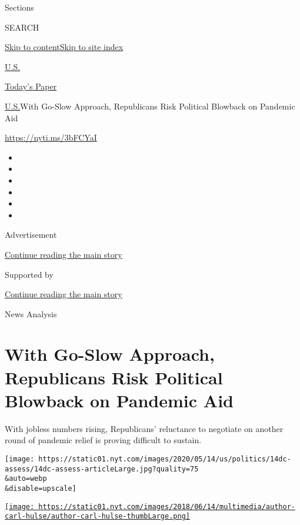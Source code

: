 Sections

SEARCH

\protect\hyperlink{site-content}{Skip to
content}\protect\hyperlink{site-index}{Skip to site index}

\href{https://www.nytimes.com/section/us}{U.S.}

\href{https://myaccount.nytimes.com/auth/login?response_type=cookie\&client_id=vi}{}

\href{https://www.nytimes.com/section/todayspaper}{Today's Paper}

\href{/section/us}{U.S.}\textbar{}With Go-Slow Approach, Republicans
Risk Political Blowback on Pandemic Aid

\href{https://nyti.ms/3bFCYaI}{https://nyti.ms/3bFCYaI}

\begin{itemize}
\item
\item
\item
\item
\item
\item
\end{itemize}

Advertisement

\protect\hyperlink{after-top}{Continue reading the main story}

Supported by

\protect\hyperlink{after-sponsor}{Continue reading the main story}

News Analysis

\hypertarget{with-go-slow-approach-republicans-risk-political-blowback-on-pandemic-aid}{%
\section{With Go-Slow Approach, Republicans Risk Political Blowback on
Pandemic
Aid}\label{with-go-slow-approach-republicans-risk-political-blowback-on-pandemic-aid}}

With jobless numbers rising, Republicans' reluctance to negotiate on
another round of pandemic relief is proving difficult to sustain.

\texttt{[image: https://static01.nyt.com/images/2020/05/14/us/politics/14dc-assess/14dc-assess-articleLarge.jpg?quality=75\\\&auto=webp\\\&disable=upscale]}

\href{https://www.nytimes.com/by/carl-hulse}{\texttt{[image: https://static01.nyt.com/images/2018/06/14/multimedia/author-carl-hulse/author-carl-hulse-thumbLarge.png]}}

